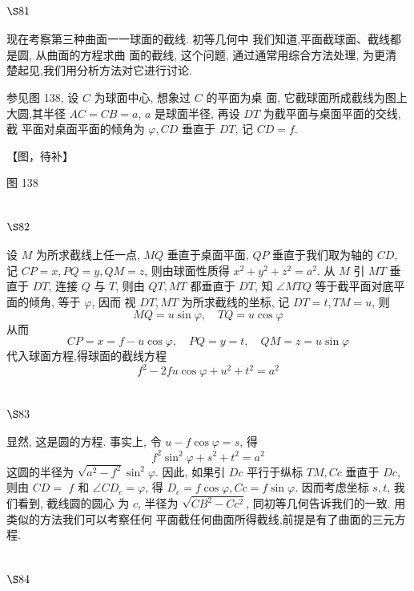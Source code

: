 \section{$\S 81$}

现在考察第三种曲面一一球面的截线. 初等几何中 我们知道,平面截球面、截线都是圆, 从曲面的方程求曲 面的截线, 这个问题, 通过通常用综合方法处理, 为更清 楚起见,我们用分析方法对它进行讨论.

参见图 138, 设 $C$ 为球面中心, 想象过 $C$ 的平面为桌 面, 它截球面所成截线为图上大圆,其半径 $A C=C B=a$, $a$ 是球面半径, 再设 $D T$ 为截平面与桌面平面的交线, 截 平面对桌面平面的倾角为 $\varphi, C D$ 垂直于 $D T$, 记 $C D=f$.


【图，待补】

图 138 

\section{$\S 82$}

设 $M$ 为所求截线上任一点, $M Q$ 垂直于桌面平面, $Q P$ 垂直于我们取为轴的 $C D$, 记 $C P=x, P Q=y, Q M=z$, 则由球面性质得 $x^{2}+y^{2}+z^{2}=a^{2}$. 从 $M$ 引 $M T$ 垂直于 $D T$, 连接 $Q$ 与 $T$, 则由 $Q T, M T$ 都垂直于 $D T$, 知 $\angle M T Q$ 等于截平面对底平面的倾角, 等于 $\varphi$, 因而 视 $D T, M T$ 为所求截线的坐标, 记 $D T=t, T M=u$, 则
\[
M Q=u \sin \varphi, \quad T Q=u \cos \varphi
\]
从而
\[
C P=x=f-u \cos \varphi, \quad P Q=y=t, \quad Q M=z=u \sin \varphi
\]
代入球面方程,得球面的截线方程
\[
f^{2}-2 f u \cos \varphi+u^{2}+t^{2}=a^{2}
\]
\section{$\S 83$}

显然, 这是圆的方程. 事实上, 令 $u-f \cos \varphi=s$, 得
\[
f^{2} \sin ^{2} \varphi+s^{2}+t^{2}=a^{2}
\]
这圆的半径为 $\sqrt{a^{2}-f^{2}} \sin ^{2} \varphi$. 因此, 如果引 $D c$ 平行于纵标 $T M, C c$ 垂直于 $D c$, 则由 $C D=$ $f$ 和 $\angle C D_{c}=\varphi$, 得 $D_{c}=f \cos \varphi, C c=f \sin \varphi$. 因而考虑坐标 $s, t$, 我们看到, 截线圆的圆心 为 $c$, 半径为 $\sqrt{C B^{2}-C c^{2}}$, 同初等几何告诉我们的一致. 用类似的方法我们可以考察任何 平面截任何曲面所得截线,前提是有了曲面的三元方程.

\section{$\S 84$}

